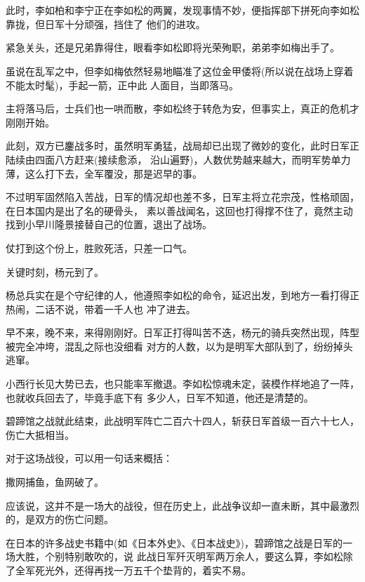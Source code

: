 \documentclass[11pt,a4paper,onecolumn]{article}
\begin{document}
\section[\thesection]{}

此时，李如柏和李宁正在李如松的两翼，发现事情不妙，便指挥部下拼死向李如松靠拢，但日军十分顽强，挡住了
他们的进攻。

紧急关头，还是兄弟靠得住，眼看李如松即将光荣殉职，弟弟李如梅出手了。

虽说在乱军之中，但李如梅依然轻易地瞄准了这位金甲倭将(所以说在战场上穿着不能太时髦)，手起一箭，正中此
人面目，当即落马。

主将落马后，士兵们也一哄而散，李如松终于转危为安，但事实上，真正的危机才刚刚开始。

此刻，双方已鏖战多时，虽然明军勇猛，战局却已出现了微妙的变化，此时日军正陆续由四面八方赶来(接续愈添，
沿山遍野)，人数优势越来越大，而明军势单力薄，这么打下去，全军覆没，那是迟早的事。

不过明军固然陷入苦战，日军的情况却也差不多，日军主将立花宗茂，性格顽固，在日本国内是出了名的硬骨头，
素以善战闻名，这回也打得撑不住了，竟然主动找到小早川隆景接替自己的位置，退出了战场。

仗打到这个份上，胜败死活，只差一口气。

关键时刻，杨元到了。

杨总兵实在是个守纪律的人，他遵照李如松的命令，延迟出发，到地方一看打得正热闹，二话不说，带着一千人也
冲了进去。

早不来，晚不来，来得刚刚好。日军正打得叫苦不迭，杨元的骑兵突然出现，阵型被完全冲垮，混乱之际也没细看
对方的人数，以为是明军大部队到了，纷纷掉头逃窜。

小西行长见大势已去，也只能率军撤退。李如松惊魂未定，装模作样地追了一阵，也就收兵回去了，毕竟手底下有
多少人，日军不知道，他还是清楚的。

碧蹄馆之战就此结束，此战明军阵亡二百六十四人，斩获日军首级一百六十七人，伤亡大抵相当。

对于这场战役，可以用一句话来概括：

撒网捕鱼，鱼网破了。

应该说，这并不是一场大的战役，但在历史上，此战争议却一直未断，其中最激烈的，是双方的伤亡问题。

在日本的许多战史书籍中(如《日本外史》、《日本战史》)，碧蹄馆之战是日军的一场大胜，个别特别敢吹的，说
此战日军歼灭明军两万余人，要这么算，李如松除了全军死光外，还得再找一万五千个垫背的，着实不易。

\section[\thesection]{}
\end{document}
